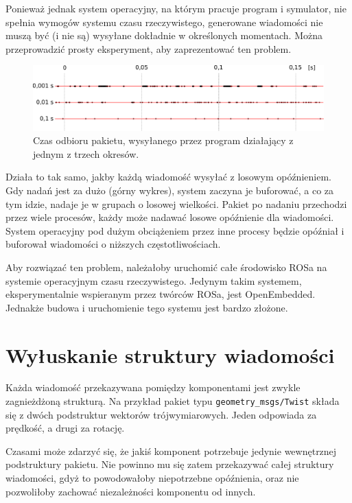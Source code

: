 	Ponieważ jednak system operacyjny, na którym pracuje program i symulator, nie spełnia wymogów systemu czasu rzeczywistego, generowane wiadomości
	nie muszą być (i nie są) wysyłane dokładnie w określonych momentach. Można przeprowadzić prosty eksperyment, aby zaprezentować ten problem.
	
	\begin{figure}[H]
	\centering
	\includegraphics[width=\textwidth]{graphics/gramofon.pdf}
	\caption{Czas odbioru pakietu, wysyłanego przez program działający z jednym z trzech okresów.}
	\end{figure}
	
	Działa to tak samo, jakby każdą wiadomość wysyłać z losowym opóźnieniem.
	Gdy nadań jest za dużo (górny wykres), system zaczyna je buforować, a co za tym idzie, nadaje je w grupach o losowej wielkości.
	Pakiet po nadaniu przechodzi przez wiele procesów, każdy może nadawać losowe opóźnienie dla wiadomości.
	System operacyjny pod dużym obciążeniem przez inne procesy będzie opóźniał i buforował wiadomości o niższych częstotliwościach.
	
	Aby rozwiązać ten problem, należałoby uruchomić całe środowisko ROSa na systemie operacyjnym czasu rzeczywistego.
	Jedynym takim systemem, eksperymentalnie wspieranym przez twórców ROSa, jest OpenEmbedded.
	Jednakże budowa i uruchomienie tego systemu jest bardzo złożone.
		
\section{Wyłuskanie struktury wiadomości}
	\label{sec:dziadzio}
	Każda wiadomość przekazywana pomiędzy komponentami jest zwykle zagnieżdżoną strukturą.
	Na przykład pakiet typu \texttt{geometry\_msgs/Twist} składa się z dwóch podstruktur wektorów trójwymiarowych.
	Jeden odpowiada za prędkość, a drugi za rotację.
	
	Czasami może zdarzyć się, że jakiś komponent potrzebuje jedynie wewnętrznej podstruktury pakietu.
	Nie powinno mu się zatem przekazywać całej struktury wiadomości, gdyż to powodowałoby niepotrzebne opóźnienia, oraz nie pozwoliłoby zachować niezależności 
	komponentu od innych.
	
